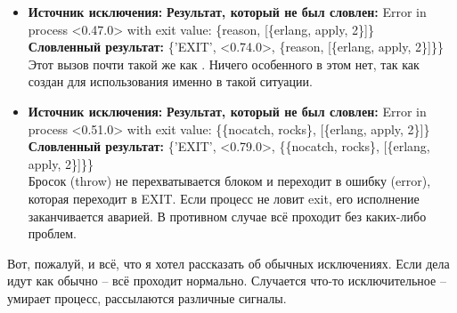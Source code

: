 \begin{itemize}
    \item \textbf{Источник исключения:} 
    \textbf{Результат, который не был словлен:} Error in process <0.47.0> with exit value: \{reason, [\{erlang, apply, 2\}]\}\\
    \textbf{Словленный результат:} \{'EXIT', <0.74.0>, \{reason, [\{erlang, apply, 2\}]\}\}\\
    Этот вызов почти такой же как .
    Ничего особенного в этом нет, так как  создан для использования именно в такой ситуации.\\
    \item \textbf{Источник исключения:} 
    \textbf{Результат, который не был словлен:} Error in process <0.51.0> with exit value: \{\{nocatch, rocks\}, [\{erlang, apply, 2\}]\}\\
    \textbf{Словленный результат:} \{'EXIT', <0.79.0>, \{\{nocatch, rocks\}, [\{erlang, apply, 2\}]\}\}\\
    Бросок (throw) не перехватывается блоком   и переходит в ошибку (error), которая переходит в EXIT.
    Если процесс не ловит exit, его исполнение заканчивается аварией.
    В противном случае всё проходит без каких\--либо проблем.
\end{itemize}

Вот, пожалуй, и всё, что я хотел рассказать об обычных исключениях.
Если дела идут как обычно \--- всё проходит нормально.
Случается что\--то исключительное \--- умирает процесс, рассылаются различные сигналы.

